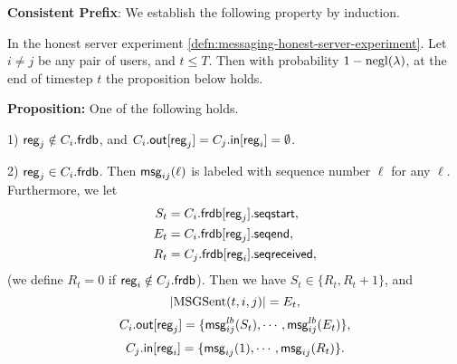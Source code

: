 \textbf{Consistent Prefix}: We establish the following property by induction.
\begin{lemma}
\label{lem:correctness-main}
In the honest server experiment \cref{defn:messaging-honest-server-experiment}. Let $i \neq j$ be any pair of users, and $t \leq T$. Then with probability $1 - \operatorname{negl}(\lambda)$, at the end of timestep $t$ the proposition below holds.

\textbf{Proposition: }One of the following holds.

1) $\mathsf{reg}_j \notin C_i.\mathsf{frdb}$, and $C_i.\mathsf{out}[\mathsf{reg}_j] = C_j.\mathsf{in}[\mathsf{reg}_i] = \emptyset$.

2) $\mathsf{reg}_j \in C_i.\mathsf{frdb}$. Then $\mathsf{msg}_{ij}(\ell)$ is labeled with sequence number $\ell$ for any $\ell$. Furthermore, we let
\begin{align*}
S_t &= C_i.\mathsf{frdb}[\mathsf{reg}_j].\mathsf{seqstart}, \\
E_t &= C_i.\mathsf{frdb}[\mathsf{reg}_j].\mathsf{seqend}, \\
R_t &= C_j.\mathsf{frdb}[\mathsf{reg}_i].\mathsf{seqreceived},
\end{align*}
(we define $R_t = 0$ if $\mathsf{reg}_i \notin C_j.\mathsf{frdb}$). Then we have $S_t \in \{R_t, R_t + 1\}$, and
$$\left| \text{MSGSent}(t, i, j) \right| = E_t,$$
$$C_i.\mathsf{out}[\mathsf{reg}_j] = \{\mathsf{msg}^{lb}_{ij}(S_t), \cdots, \mathsf{msg}^{lb}_{ij}(E_t)\},$$
$$C_j.\mathsf{in}[\mathsf{reg}_i] = \{\mathsf{msg}_{ij}(1), \cdots, \mathsf{msg}_{ij}(R_t)\}.$$
\end{lemma}
